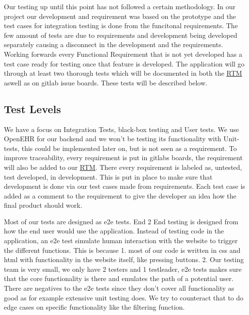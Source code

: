 Our testing up until this point has not followed a certain methodology. In our project our development and requirement was based on the prototype and the test cases for integration testing is done from the funcitonal requirements. The few amount of tests are due to requirements and development being developed separately causing a disconnect in the development and the requirements. Working forwards every Functional Requirement that is not yet developed has a test case ready for testing once that feature is developed. The application will go through at least two thorough tests which will be documented in both the \href{https://gitlab.liu.se/tddc88-company-3-2020/deploy/-/tree/Document_branch/RTM}{\underline RTM} aswell as on gitlab issue boards. These tests will be described below.

\subsection{Test Levels}
We have a focus on Integration Tests, black-box testing and User tests. We use OpenEHR for our backend and we won't be testing its functionality with Unit-tests, this could be implemented later on, but is not seen as a requirement. To improve traceability, every requirement is put in gitlabs boards, the requirement will also be added to our \href{https://gitlab.liu.se/tddc88-company-3-2020/deploy/-/tree/Document_branch/RTM}{\underline RTM}. There every requirement is labeled as, untested, test developed, in development. This is put in place to make sure that development is done via our test cases made from requirements. Each test case is added as a comment to the requirement to give the developer an idea how the final product should work.



Most of our tests are designed as e2e tests. End 2 End testing is designed from how the end user would use the application. Instead of testing code in the application, an e2e test simulate human interaction with the website to trigger the different functions. This is because 1. most of our code is written in css and html with functionality in the website itself, like pressing buttons. 2. Our testing team is very small, we only have 2 testers and 1 testleader, e2e tests makes sure that the core functionality is there and emulates the path of a potential user. There are negatives to the e2e tests since they don't cover all functionality as good as for example extensive unit testing does. We try to counteract that to do edge cases on specific functionality like the filtering function.

